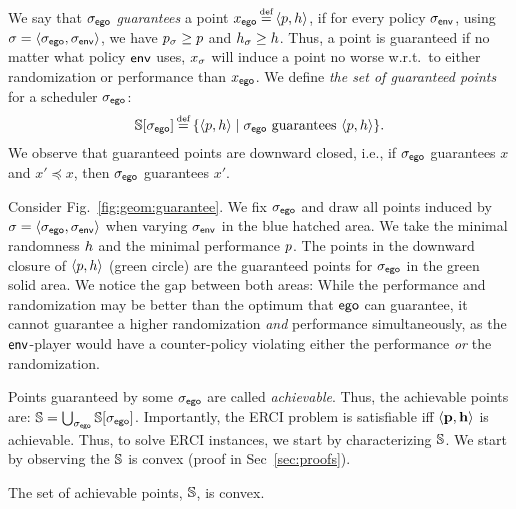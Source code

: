 We say that ${\sigma_{\mathsf{ego}}}$ \emph{guarantees} a point $x_\pOne \eqdef
\langle \scp, \rndp \rangle$, if for every policy ${\sigma_{\mathsf{env}}}$, using
$\sigma = \langle {\sigma_{\mathsf{ego}}}, {\sigma_{\mathsf{env}}} \rangle$, we have
$p_\sigma \geq p$ and $h_\sigma \geq h$. Thus, a point
is guaranteed if no matter what policy $\mathsf{env}$ uses, $x_\sigma$ will
induce a point no worse w.r.t.\ to either randomization or performance
than $x_{\mathsf{ego}}$. 
We define
\emph{the set of guaranteed points} for a scheduler ${\sigma_{\mathsf{ego}}}$:
\begin{equation}\label{eq:guaranteed}
  \solutions[\pOneSched] \eqdef \{ \langle \scp, \rndp \rangle \mid  \pOneSched \text{ guarantees } \langle \scp, \rndp \rangle \}.
\end{equation}
We observe that guaranteed points are
downward closed, i.e., if ${\sigma_{\mathsf{ego}}}$ guarantees $x$ and $x' \preceq x$,
then ${\sigma_{\mathsf{ego}}}$ guarantees $x'$.
\begin{example}
Consider Fig.~\ref{fig:geom:guarantee}. We fix ${\sigma_{\mathsf{ego}}}$ and draw all points induced by $\sigma = \langle {\sigma_{\mathsf{ego}}}, {\sigma_{\mathsf{env}}} \rangle$ when varying ${\sigma_{\mathsf{env}}}$ in the blue hatched area. We take the minimal randomness $h$ and the minimal performance $p$. The points in the downward closure  of $\langle p, h \rangle$ (green circle) are the guaranteed points for ${\sigma_{\mathsf{ego}}}$ in the green solid area.	
We notice the gap between both areas: While the performance and randomization may be better than the optimum that $\mathsf{ego}$ can guarantee, it cannot guarantee a higher randomization \emph{and} performance simultaneously, as  the $\mathsf{env}$-player would have a counter-policy violating either the performance \emph{or} the randomization.
\end{example}

Points guaranteed by some ${\sigma_{\mathsf{ego}}}$ are called
\emph{achievable}. Thus, the achievable points are: $ \mathbb{S} =
\bigcup_{{\sigma_{\mathsf{ego}}}} \mathbb{S}[{\sigma_{\mathsf{ego}}}]$.  Importantly, the ERCI problem is satisfiable iff $\langle \mathbf{p},
\mathbf{h} \rangle$ is achievable. 
Thus, to solve ERCI instances, we start by characterizing
$\mathbb{S}$. We start by observing the $\mathbb{S}$ is convex (proof in Sec~\ref{sec:proofs}).


\begin{proposition}\label{prop:convex}
  The set of achievable points, $\mathbb{S}$, is convex. 
\end{proposition}


